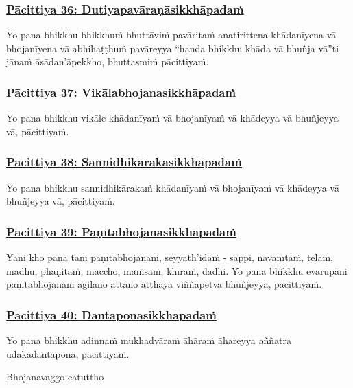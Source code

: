 \subsubsection*{\hyperref[exp36]{Pācittiya 36: Dutiyapavāraṇāsikkhāpadaṁ}}
\label{pac36}

Yo pana bhikkhu bhikkhuṁ bhuttāviṁ pavāritaṁ anatirittena khādanīyena vā bhojanīyena vā abhihaṭṭhuṁ pavāreyya “handa bhikkhu khāda vā bhuñja vā”ti jānaṁ āsādan'āpekkho, bhuttasmiṁ pācittiyaṁ.

\subsubsection*{\hyperref[exp37]{Pācittiya 37: Vikālabhojanasikkhāpadaṁ}}
\label{pac37}

Yo pana bhikkhu vikāle khādanīyaṁ vā bhojanīyaṁ vā khādeyya vā bhuñjeyya vā, pācittiyaṁ.

\subsubsection*{\hyperref[exp38]{Pācittiya 38: Sannidhikārakasikkhāpadaṁ}}
\label{pac38}

Yo pana bhikkhu sannidhikārakaṁ khādanīyaṁ vā bhojanīyaṁ vā khādeyya vā bhuñjeyya vā, pācittiyaṁ.

\subsubsection*{\hyperref[exp39]{Pācittiya 39: Paṇītabhojanasikkhāpadaṁ}}
\label{pac39}

Yāni kho pana tāni paṇītabhojanāni, seyyath'idaṁ - sappi, navanītaṁ, telaṁ, madhu, phāṇitaṁ, maccho, maṁsaṁ, khīraṁ, dadhi. Yo pana bhikkhu evarūpāni paṇītabhojanāni agilāno attano atthāya viññāpetvā bhuñjeyya, pācittiyaṁ.

\subsubsection*{\hyperref[exp40]{Pācittiya 40: Dantaponasikkhāpadaṁ}}
\label{pac40}

Yo pana bhikkhu adinnaṁ mukhadvāraṁ āhāraṁ āhareyya aññatra udakadantaponā, pācittiyaṁ.

\begin{center}
  Bhojanavaggo catuttho
\end{center}

